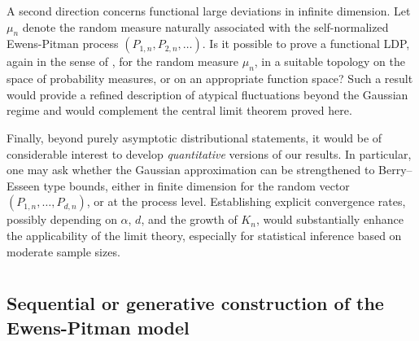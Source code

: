 \documentclass[twoside,12pt]{article}
\begin{document}
A second direction concerns functional large deviations in infinite dimension. Let $\mu_n$ denote the random measure naturally associated with the self-normalized Ewens-Pitman process $(P_{1,n},P_{2,n},\ldots)$. Is it possible to prove a functional LDP, again in the sense of \citet{Dem(98)}, for the random measure $\mu_n$, in a suitable topology on the space of probability measures, or on an appropriate function space? Such a result would provide a refined description of atypical fluctuations beyond the Gaussian regime and would complement the central limit theorem proved here.

Finally, beyond purely asymptotic distributional statements, it would be of considerable interest to develop \emph{quantitative} versions of our results. In particular, one may ask whether the Gaussian approximation can be strengthened to Berry--Esseen type bounds, either in finite dimension for the random vector $(P_{1,n},\ldots,P_{d,n})$, or at the process level. Establishing explicit convergence rates, possibly depending on $\alpha$, $d$, and the growth of $K_n$, would substantially enhance the applicability of the limit theory, especially for statistical inference based on moderate sample sizes.


\appendix
\section{}\label{appa}
\renewcommand{\thesection}{A}
\renewcommand{\thesubsection}{A.\arabic{subsection}}
\renewcommand{\thesubsubsection}{A.\arabic{subsection}.\arabic{subsubsection}}
\renewcommand{\theequation}{A.\arabic{equation}}
\renewcommand{\thethm}{\thesection.\arabic{thm}}



\setcounter{subsection}{0}
\setcounter{subsubsection}{0}
\setcounter{equation}{0}
\setcounter{thm}{0}

\subsection{Sequential or generative construction of the Ewens-Pitman model}
\end{document}
